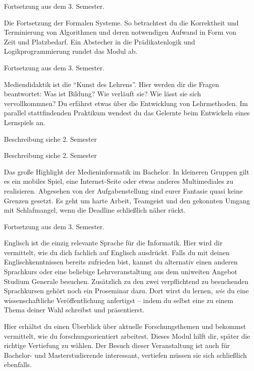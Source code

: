 Fortsetzung aus dem 3. Semester.

Die Fortsetzung der Formalen Systeme.
So betrachtest du die Korrektheit und Terminierung von Algorithmen und deren notwendigen Aufwand in Form von Zeit und Platzbedarf.
Ein Abstecher in die Prädikatenlogik und Logikprogrammierung rundet das Modul ab.

Fortsetzung aus dem 3. Semester.

Mediendidaktik ist die \enquote{Kunst des Lehrens}.
Hier werden dir die Fragen beantwortet:
Was ist Bildung?
Wie verläuft sie?
Wie lässt sie sich vervollkommnen?
Du erfährst etwas über die Entwicklung von Lehrmethoden.
Im parallel stattfindenden Praktikum wendest du das Gelernte beim Entwickeln eines Lernspiels an.

Beschreibung siehe 2. Semester

Beschreibung siehe 2. Semester

Das große Highlight der Medieninformatik im Bachelor.
In kleineren Gruppen gilt es ein mobiles Spiel, eine Internet-Seite oder etwas anderes Multimediales zu realisieren.
Abgesehen von der Aufgabenstellung sind eurer Fantasie quasi keine Grenzen gesetzt.
Es geht um harte Arbeit, Teamgeist und den gekonnten Umgang mit Schlafmangel, wenn die Deadline schließlich näher rückt.

Fortsetzung aus dem 3. Semester.

Englisch ist die einzig relevante Sprache für die Informatik.
Hier wird dir vermittelt, wie du dich fachlich auf Englisch ausdrückt.
Falls du mit deinen Englischkenntnissen bereits zufrieden bist, kannst du alternativ einen anderen Sprachkurs oder eine beliebige Lehrveranstaltung aus dem uniweiten Angebot Studium Generale besuchen.
Zusätzlich zu den zwei verpflichtend zu besuchenden Sprachkursen gehört noch ein Proseminar dazu.
Dort wirst du lernen, \textit{wie} du eine wissenschaftliche Veröffentlichung anfertigst -- indem du selbst eine zu einem Thema deiner Wahl schreibst und präsentierst.

Hier erhältst du einen Überblick über aktuelle Forschungsthemen und bekommst vermittelt, wie du forschungsorientiert arbeitest.
Dieses Modul hilft dir, später die richtige Vertiefung zu wählen. Der Besuch dieser Veranstaltung ist auch für Bachelor- und Masterstudierende interessant, vertiefen müssen sie sich schließlich ebenfalls.

